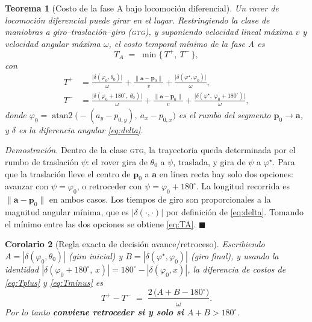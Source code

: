 \documentclass[11pt,a4paper]{article}
\newtheorem{teorema}{Teorema}[section]
\newtheorem{corolario}[teorema]{Corolario}
\theoremstyle{definition}
\newenvironment{demo}{\par\noindent\textit{Demostración.}\;}{\hfill$\blacksquare$\par\medskip}
\newcommand{\pp}{\mathbf{p}}
\newcommand{\aaa}{\mathbf{a}}
\newcommand{\atantwo}{\operatorname{atan2}}
\newcommand{\grados}{^{\circ}}
\begin{document}
\begin{teorema}[Costo de la fase A bajo locomoción diferencial]
\label{teo:RTR}
Un rover de locomoción diferencial puede girar en el lugar. Restringiendo la clase de
maniobras a \emph{giro--traslación--giro} (\textsc{gtg}), y suponiendo velocidad lineal
máxima $v$ y velocidad angular máxima $\omega$, el costo temporal mínimo de la fase A es
\begin{equation}
  T_A \;=\; \min\Big\{\,T^{+},\ T^{-}\,\Big\},
  \label{eq:TA}
\end{equation}
con
\begin{align}
  T^{+} &= \frac{\big|\delta(\varphi_{0},\theta_0)\big|}{\omega}
         + \frac{\|\aaa - \pp_0\|}{v}
         + \frac{\big|\delta(\varphi^\star, \varphi_{0})\big|}{\omega},
  \label{eq:Tplus}\\
  T^{-} &= \frac{\big|\delta(\varphi_{0}+180\grados,\ \theta_0)\big|}{\omega}
         + \frac{\|\aaa - \pp_0\|}{v}
         + \frac{\big|\delta(\varphi^\star,\ \varphi_{0}+180\grados)\big|}{\omega},
  \label{eq:Tminus}
\end{align}
donde $\varphi_{0} = \atantwo\big(-(a_y - p_{0,y}),\ a_x - p_{0,x}\big)$ es el rumbo del
segmento $\pp_0 \to \aaa$, y $\delta$ es la diferencia angular \eqref{eq:delta}.
\end{teorema}

\begin{demo}
Dentro de la clase \textsc{gtg}, la trayectoria queda determinada por el rumbo de
traslación $\psi$: el rover gira de $\theta_0$ a $\psi$, traslada, y gira de $\psi$ a
$\varphi^\star$. Para que la traslación lleve el centro de $\pp_0$ a $\aaa$ en línea
recta hay solo dos opciones: avanzar con $\psi = \varphi_0$, o retroceder con
$\psi = \varphi_0 + 180\grados$. La longitud recorrida es $\|\aaa-\pp_0\|$ en ambos
casos. Los tiempos de giro son proporcionales a la magnitud angular mínima, que es
$|\delta(\cdot,\cdot)|$ por definición de \eqref{eq:delta}. Tomando el mínimo entre las
dos opciones se obtiene \eqref{eq:TA}.
\end{demo}

\begin{corolario}[Regla exacta de decisión avance/retroceso]
\label{cor:retroceso}
Escribiendo $A = |\delta(\varphi_0,\theta_0)|$ (giro inicial) y
$B = |\delta(\varphi^\star,\varphi_0)|$ (giro final), y usando la identidad
$|\delta(\varphi_0+180\grados,\,x)| = 180\grados - |\delta(\varphi_0,x)|$, la diferencia
de costos de \eqref{eq:Tplus} y \eqref{eq:Tminus} es
\begin{equation}
  T^{+} - T^{-} \;=\; \frac{2\,\big(A + B - 180\grados\big)}{\omega} .
  \label{eq:regla-retroceso}
\end{equation}
Por lo tanto \textbf{conviene retroceder si y solo si $A + B > 180\grados$}.
\end{corolario}
\end{document}
